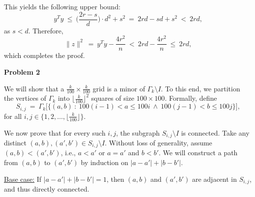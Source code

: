 \documentclass[12pt]{article}
\begin{document}
	\medskip
	
	This yields the following upper bound:
	\[
		y^{T} y \ \leqslant \ \bigg( \frac{2 r - s}{d} \bigg) \cdot d^{2} +
		s^{2} \ = \ 2 r d - s d + s^{2} \ < \ 2 r d \text{,}
	\]
	as \(s < d\). Therefore,
	\[
		\|z\|^{2} \ = \ y^{T} y - \frac{4 r^{2}}{n} \ < \ 2 r d -
		\frac{4 r^{2}}{n} \ \leqslant \ 2 r d \text{,}
	\]
	which completes the proof.
	
	\bigskip
	
	\textbf{Problem 2}
	
	\medskip
	
	We will show that a \(\frac{k}{100} \times \frac{k}{100}\) grid is a minor
	of \(\Gamma_{k} \setminus I\). To this end, we partition the vertices of
	\(\Gamma_{k}\) into \(\big\lfloor \frac{k}{100} \big\rfloor^{2}\) squares of
	size \(100 \times 100\). Formally, define
	\[
		S_{i, j} \ = \ \Gamma_{k} \big[ \{(a, b) \ : \ 100 (i - 1) < a \leqslant
		100 i \ \wedge \ 100 (j - 1) < b \leqslant 100 j\} \big] \text{,}
	\]
	for all \(i, j \in \big\{ 1, 2, \ldots, \big\lfloor \frac{k}{100}
	\big\rfloor \big\}\).
	
	\medskip
	
	We now prove that for every such \(i, j\), the subgraph \(S_{i, j} \setminus
	I\) is connected. Take any distinct \((a, b), (a', b') \in S_{i, j}
	\setminus I\). Without loss of generality, assume \((a, b) < (a', b')\),
	i.e., \(a < a'\) or \(a = a'\) and \(b < b'\). We will construct a path from
	\((a, b)\) to \((a', b')\) by induction on \(|a - a'| + |b - b'|\).
	
	\medskip
	
	\underline{Base case:} If \(|a - a'| + |b - b'| = 1\), then \((a, b)\) and
	\((a', b')\) are adjacent in \(S_{i, j}\), and thus directly connected.
	
	\medskip
	
\end{document}
